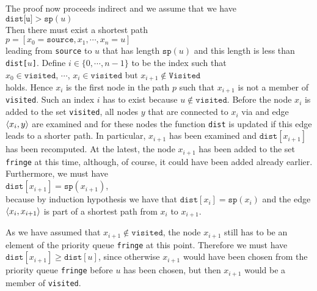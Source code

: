 \begin{enumerate}
      The proof now proceeds indirect and we assume that we have
      \\[0.2cm]
      \hspace*{1.3cm} $\texttt{dist[u]} > \texttt{sp}(u)$
      \\[0.2cm]
      Then there must exist a shortest path 
      \\[0.2cm]
      \hspace*{1.3cm} $p = [ x_0 = \texttt{source}, x_1, \cdots, x_n = u ]$
      \\[0.2cm]
      leading from \texttt{source} to $u$ that has length $\texttt{sp}(u)$ and this length is less
      than \texttt{dist[$u$]}.  Define  $i\in\{0,\cdots,n-1\}$ to be the index such that
      \\[0.2cm]
      \hspace*{1.3cm}
      $x_0\in \texttt{visited}$, $\cdots$, $x_i\in \texttt{visited}$ \quad but \quad $x_{i+1} \not\in \mathtt{Visited}$
      \\[0.2cm]
      holds.  Hence $x_i$ is the first node in the path  $p$ such that $x_{i+1}$ is not a member of
      \texttt{visited}.  Such an index $i$ has to exist because $u \not\in \mathtt{visited}$.
      Before the node $x_i$ is added to the set \texttt{visited}, all nodes $y$ that are connected
      to $x_i$ via and edge $\pair(x_i, y)$ are examined and for these nodes the function
      \texttt{dist} is updated if this edge leads to a shorter path.  In particular, $x_{i+1}$ has
      been examined and $\texttt{dist}[x_{i+1}]$ has been recomputed.  At the latest, the node
      $x_{i+1}$ has been added to the set  \texttt{fringe} at this time, although, of course, it
      could have been added already earlier.  Furthermore, we must have
      \\[0.2cm]
      \hspace*{1.3cm}
      $\texttt{dist}[x_{i+1}] = \texttt{sp}(x_{i+1})$,
      \\[0.2cm]
      because by induction hypothesis we have that $\texttt{dist}[x_i] = \texttt{sp}(x_i)$ and 
      the edge $\pair(x_i,x_{i+1})$ is part of a shortest path from  $x_i$ to $x_{i+1}$.
      
      As we have assumed that $x_{i+1} \not\in \texttt{visited}$, the node $x_{i+1}$ still has to be an
      element of the priority queue \texttt{fringe} at this point.  Therefore we must have
      $\texttt{dist}[x_{i+1}] \geq \texttt{dist}[u]$, since otherwise  $x_{i+1}$ would have been
      chosen from the priority queue \texttt{fringe} before $u$ has been chosen, but then $x_{i+1}$
      would be a member of \texttt{visited}.


\end{enumerate}
